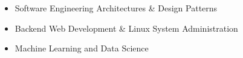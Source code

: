 

{\fontsize{11pt}{1em}\bodyfontlight\upshape\color{text}
	\begin{itemize}
		\item Software Engineering Architectures \& Design Patterns 
		\item Backend Web Development \& Linux System Administration
		\item Machine Learning and Data Science
	\end{itemize}
}

